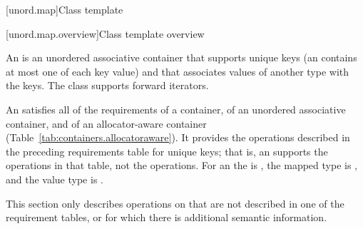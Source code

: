 [unord.map]{Class template }%

[unord.map.overview]{Class template  overview}

\pnum
{}%
%
An  is an unordered associative container that
supports unique keys (an  contains at most one of each
key value) and that associates values of another type
 with the keys.
The  class
supports forward iterators.

\pnum
An  satisfies all of the requirements of a container, of an unordered associative container, and of an allocator-aware container (Table~\ref{tab:containers.allocatoraware}). It provides the operations described in the preceding requirements table for unique keys; that is, an  supports the  operations in that table, not the  operations. For an  the  is , the mapped type is , and the value type is .

\pnum
This section only describes operations on  that
are not described in one of the requirement tables, or for which there
is additional semantic information.

